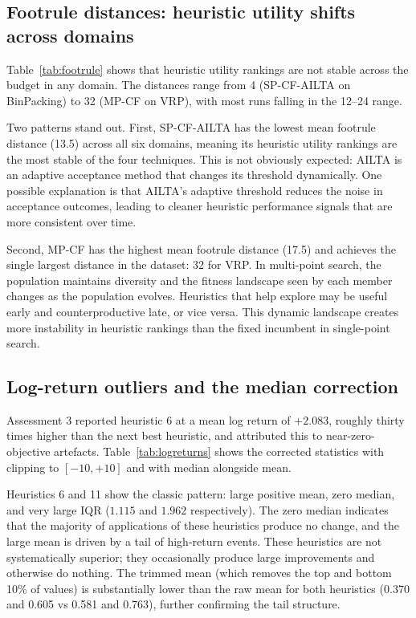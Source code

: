 \documentclass[11pt,a4paper]{article}
\begin{document}
\subsection{Footrule distances: heuristic utility shifts across domains}

Table~\ref{tab:footrule} shows that heuristic utility rankings are not stable
across the budget in any domain. The distances range from 4 (SP-CF-AILTA on
BinPacking) to 32 (MP-CF on VRP), with most runs falling in the 12--24 range.

Two patterns stand out. First, SP-CF-AILTA has the lowest mean footrule distance
(13.5) across all six domains, meaning its heuristic utility rankings are the most
stable of the four techniques. This is not obviously expected: AILTA is an adaptive
acceptance method that changes its threshold dynamically. One possible explanation is
that AILTA's adaptive threshold reduces the noise in acceptance outcomes, leading to
cleaner heuristic performance signals that are more consistent over time.

Second, MP-CF has the highest mean footrule distance (17.5) and achieves the single
largest distance in the dataset: 32 for VRP. In multi-point search, the population
maintains diversity and the fitness landscape seen by each member changes as the
population evolves. Heuristics that help explore may be useful early and counterproductive
late, or vice versa. This dynamic landscape creates more instability in heuristic
rankings than the fixed incumbent in single-point search.

\subsection{Log-return outliers and the median correction}

Assessment 3 reported heuristic 6 at a mean log return of $+2.083$, roughly thirty
times higher than the next best heuristic, and attributed this to near-zero-objective
artefacts. Table~\ref{tab:logreturns} shows the corrected statistics with clipping
to $[-10, +10]$ and with median alongside mean.

Heuristics 6 and 11 show the classic pattern: large positive mean, zero median, and
very large IQR ($1.115$ and $1.962$ respectively). The zero median indicates that
the majority of applications of these heuristics produce no change, and the large
mean is driven by a tail of high-return events. These heuristics are not systematically
superior; they occasionally produce large improvements and otherwise do nothing. The
trimmed mean (which removes the top and bottom 10\% of values) is substantially lower
than the raw mean for both heuristics (0.370 and 0.605 vs 0.581 and 0.763), further
confirming the tail structure.
\end{document}
